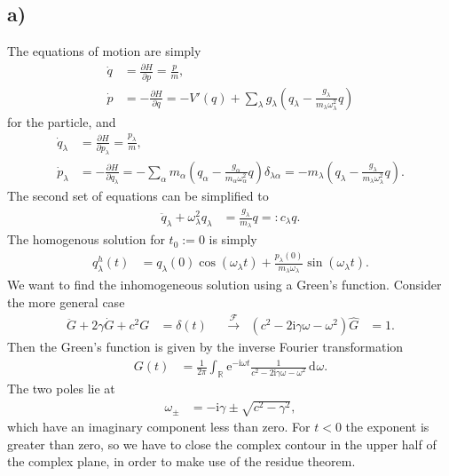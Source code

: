 \documentclass[english, parskip=full]{scrartcl}
\newcommand{\intr}{}
\newcommand{\kla}{}
\renewcommand{\i}{\text{i}}
\newcommand{\e}{\text{e}}
\begin{document}
\subsection*{a)}
The equations of motion are simply
\begin{align}
\dot{q}&=\frac{\partial H}{\partial p}=\frac{p}{m},\\
\dot{p}&=-\frac{\partial H}{\partial q}=-V'(q) + \sum_\lambda g_\lambda \kla\left( q_\lambda - \frac{g_\lambda}{m_\lambda \omega_\lambda^2}q \right)
\end{align}
for the particle, and
\begin{align}
\dot{q}_\lambda&=\frac{\partial H}{\partial p_\lambda} = \frac{p_\lambda}{m},\\
\dot{p}_\lambda&=-\frac{\partial H}{\partial q_\lambda} = -\sum_\alpha m_\alpha \kla\left( q_\alpha - \frac{g_\alpha}{m_\alpha\omega_\alpha^2} q \right) \delta_{\lambda\alpha}=-m_\lambda\kla\left( q_\lambda - \frac{g_\lambda}{m_\lambda\omega_\lambda^2}q \right).
\end{align}
The second set of equations can be simplified to
\begin{align}
\ddot{q}_\lambda +\omega_\lambda^2q_\lambda&=\frac{g_\lambda}{m_\lambda}q=:c_\lambda q.
\end{align}
The homogenous solution for $t_0:=0$ is simply
\begin{align}
q_\lambda^h(t)&=q_\lambda(0)\cos\kla\left( \omega_\lambda t \right) + \frac{p_\lambda(0)}{m_\lambda\omega_\lambda} \sin\kla\left( \omega_\lambda t \right).
\end{align}
We want to find the inhomogeneous solution using a Green's function.
Consider the more general case
\begin{align}
\ddot{G}+2\gamma\dot{G} +c^2G&=\delta(t)&&\overset{\mathcal{F}}{\longrightarrow}&\kla\left( c^2-2\i\gamma\omega - \omega^2 \right)\hat{G}&=1.
\end{align}
Then the Green's function is given by the inverse Fourier transformation
\begin{align}
G(t)&=\frac{1}{2\pi}\intr\int_{\mathbb{R}^{ }} \e^{-\i \omega t}\frac{1}{c^2-2\i\gamma\omega-\omega^2} \, \mathrm{d}^{ }\omega.
\end{align}
The two poles lie at
\begin{align}
\omega_\pm&=-\i\gamma\pm\sqrt{c^2-\gamma^2},
\end{align}
which have an imaginary component less than zero.
For $t<0$ the exponent is greater than zero, so we have to close the complex contour in the upper half of the complex plane, in order to make use of the residue theorem.
\end{document}

